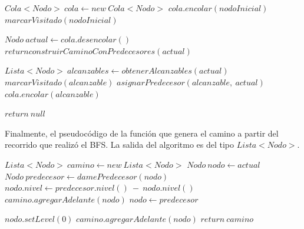 \vspace{2mm}
\begin{algorithmic}[1]

	\State$Cola<Nodo>\: cola \gets new \:Cola<Nodo>$
	\State$cola.encolar(nodoInicial)$
	\State$marcarVisitado(nodoInicial)$
	
		\State $Nodo \:actual \gets cola.desencolar()$
			\State $return construirCaminoConPredecesores(actual)$

		\EndIf
			
		\State $Lista<Nodo> \: alcanzables \gets obtenerAlcanzables(actual)$
			\Comment				
				\State$marcarVisitado(alcanzable)$
				\State$	asignarPredecesor(alcanzable,\: actual)$
				\State$	cola.encolar(alcanzable)$	
			\EndIf
			
		\EndFor
		\EndWhile
		\State $return\: null$

\EndProcedure
\end{algorithmic}
\vspace{2mm}
Finalmente, el pseudoc\'odigo de la funci\'on que genera el camino a partir del recorrido que realiz\'o el BFS. La salida del algoritmo es del tipo $Lista<Nodo>$.
\vspace{2mm}
\begin{algorithmic}[1]


		\State $Lista<Nodo>\: camino \gets new\: Lista<Nodo>$
		\State $Nodo\: nodo \gets actual$
			\State $Nodo\: predecesor \gets damePredecesor(nodo)$
			\State $nodo.nivel \gets predecesor.nivel()\: -\: nodo.nivel()$
			\State $camino.agregarAdelante(nodo)$
			\State $nodo \gets predecesor$

		\EndWhile

		\State $nodo.setLevel(0)$
		\State $camino.agregarAdelante(nodo)$
		\State $return\: camino$
		
\EndProcedure
\end{algorithmic}


